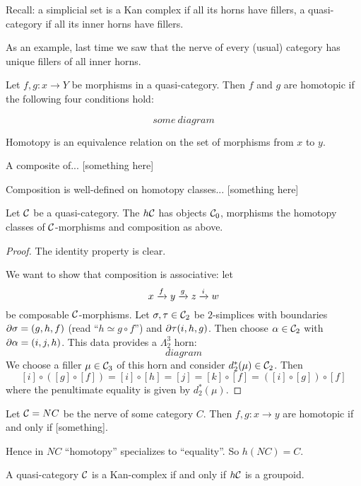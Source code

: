 

Recall: a simplicial set is a Kan complex if all its horns have fillers, a quasi-category if all its inner horns have fillers.

As an example, last time we saw that the nerve of every (usual) category has unique fillers of all inner horns.

Let $f,g:x\to Y$ be morphisms in a quasi-category. Then $f$ and $g$ are homotopic if the following four conditions hold:

\[some\ diagram\]

Homotopy is an equivalence relation on the set of morphisms from $x$ to $y$.

A composite of... [something here]

Composition is well-defined on homotopy classes... [something here]

\begin{thmdef}
Let $\mathcal{C}$ be a quasi-category. The  $h\mathcal{C}$ has objects $\mathcal{C}_0$, morphisms the homotopy classes of $\mathcal{C}$-morphisms and composition as above.
\end{thmdef}

\begin{proof}
The identity property is clear.

We want to show that composition is associative: let
\[x\xrightarrow{f}y\xrightarrow{g}z\xrightarrow{i}w\]
be composable $\mathcal{C}$-morphisms. Let $\sigma,\tau\in\mathcal{C}_2$ be $2$-simplices with boundaries $\partial\sigma=(g,h,f)$ (read \enquote{$h\simeq g\circ f$}) and $\partial\tau(i,h,g)$. Then choose $\alpha\in\mathcal{C}_2$ with $\partial\alpha=(i,j,h)$. This data provides a $\Lambda^3_2$ horn:
\[diagram\]
We choose a filler $\mu\in\mathcal{C}_3$ of this horn and consider $d_2^*(\mu)\in\mathcal{C}_2$. Then
\[[i]\circ([g]\circ[f])=[i]\circ[h]=[j]=[k]\circ[f]=([i]\circ[g])\circ[f]\]
where the penultimate equality is given by $d_2^*(\mu)$.
\end{proof}

\begin{example}
Let $\mathcal{C}=NC$ be the nerve of some category $C$. Then $f,g:x\to y$ are homotopic if and only if [something].

Hence in $NC$ \enquote{homotopy} specializes to \enquote{equality}. So $h(NC)=C$.
\end{example}

\begin{theorem}[Joyal]
A quasi-category $\mathcal{C}$ is a Kan-complex if and only if $h\mathcal{C}$ is a groupoid.
\end{theorem}


